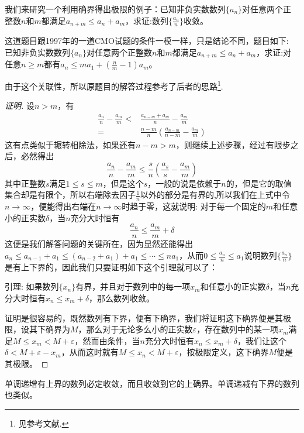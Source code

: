 \begin{example}
  我们来研究一个利用确界得出极限的例子：已知非负实数数列$\{a_n\}$对任意两个正整数$n$和$m$都满足$a_{n+m} \leqslant a_n+a_m$，求证:数列$\{\frac{a_n}{n}\}$收敛。

这道题目跟1997年的一道CMO试题的条件一模一样，只是结论不同，题目如下: 已知非负实数数列$\{a_n\}$对任意两个正整数$n$和$m$都满足$a_{n+m} \leqslant a_n+a_m$，求证:对任意$n \geqslant m$都有$a_n \leqslant ma_1+\left( \frac{n}{m}-1\right)a_m$。

由于这个关联性，所以原题目的解答过程参考了后者的思路\footnote{见参考文献\cite{olympic-math}.}.

\begin{proof}[证明]
设$n>m$，有
\begin{align*}
\frac{a_n}{n} - \frac{a_m}{m} < & \frac{a_{n-m}+a_m}{n} - \frac{a_m}{m} \\
 = & \frac{n-m}{n} \left( \frac{a_{n-m}}{n-m} - \frac{a_m}{m} \right)
\end{align*}
这有点类似于辗转相除法，如果还有$n-m>m$，则继续上述步骤，经过有限步之后，必然得出
\[ \frac{a_n}{n} - \frac{a_m}{m} \leqslant \frac{s}{n} \left( \frac{a_s}{s} - \frac{a_m}{m} \right) \]
其中正整数$s$满足$1 \leqslant s \leqslant m$，但是这个$s$，一般的说是依赖于$n$的，但是它的取值集合却是有限个，所以右端除去因子$\frac{1}{n}$以外的部分是有界的,所以我们在上式中令$n \to \infty$，便能得出右端在$n \to \infty$时趋于零，这就说明: 对于每一个固定的$m$和任意小的正实数$\delta$，当$n$充分大时恒有
\[ \frac{a_n}{n} \leqslant \frac{a_m}{m} + \delta \]
这便是我们解答问题的关键所在，因为显然还能得出$a_n \leqslant a_{n-1}+a_1 \leqslant (a_{n-2}+a_1)+a_1 \leqslant \cdots \leqslant na_1$，从而$0 \leqslant \frac{a_n}{n} \leqslant a_1$说明数列$\{\frac{a_n}{n}\}$是有上下界的，因此我们只要证明如下这个引理就可以了：

引理: 如果数列$\{ x_n \}$有界，并且对于数列中的每一项$x_m$和任意小的正实数$\delta$，当$n$充分大时恒有$x_n \leqslant x_m+\delta$，那么数列收敛。

证明是很容易的，既然数列有下界，便有下确界，我们将证明这下确界便是其极限，设其下确界为$M$，那么对于无论多么小的正实数$\varepsilon$，存在数列中的某一项$x_m$满足$M \leqslant x_m  < M+\varepsilon$，然而由条件，当$n$充分大时恒有$x_n \leqslant x_m+\delta$，我们让这个$\delta<M+\varepsilon-x_m$，从而这时就有$M \leqslant x_n  < M+\varepsilon$，按极限定义，这下确界$M$便是其极限。
\end{proof}
\end{example}


\begin{theorem}
  单调递增有上界的数列必定收敛，而且收敛到它的上确界。单调递减有下界的数列也类似。
\end{theorem}

